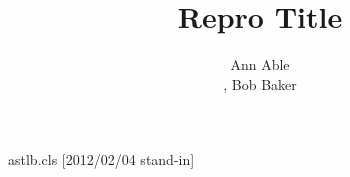\begin{filecontents*}{astlb.cls}
[2012/02/04 stand-in]
\def\email#1{\textsuperscript{*}\gdef\@email{#1}}
\def\@@email#1{\let\oldthefootnote\thefootnote\renewcommand\thefootnote{\relax}%
  \footnotetext{\hspace{-\parindent}\textsuperscript{*}e-mail: #1}\let\thefootnote\oldthefootnote
  \setcounter{footnote}{0}}
\def\author#1{\gdef\@author{#1}}
\renewcommand\thempfootnote{\arabic{mpfootnote}}
\def\@maketitle{\begin{center}\begin{minipage}{0.885\linewidth}%
  \def\address##1{\textsuperscript{##1}}%
  \def\addresstext##1##2{\footnotetext[##1]{\itshape ##2}}%
  \begin{center}{\large\bfseries\@title\par}{\bfseries\@author\par}\end{center}%
  \end{minipage}\end{center}}
\renewenvironment{abstract}{\par\textbf{Abstract ---}}{\par\maketitle\@@email{\@email}}
\end{filecontents*}
\documentclass{astlb}
\title{Repro Title}
\author{Ann Able\address{1},
  Bob Baker\address{1,2}
}

\begin{abstract}Abstract words.\end{abstract}
Body text.

